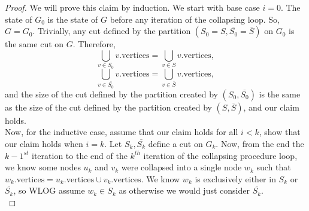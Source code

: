 \documentclass[psamsfonts, 10pt]{amsart}
\theoremstyle{definition}
\theoremstyle{remark}
\numberwithin{equation}{section}
\begin{document}
\begin{proof}
We will prove this claim by induction. We start with base case $i = 0$. The state of $G_0$ is the state of $G$ before any iteration of the collapsing loop. So, $G = G_0$. Trivially, any cut defined by the partition $(S_0 = S, \overline{S_0} = \overline{S})$ on $G_0$ is the same cut on $G$. Therefore,
\[
\bigcup_{v \in S_0} v.\text{vertices} = \bigcup_{v \in S} v.\text{vertices},
\]
\[
\bigcup_{v \in \overline{S_0}} v.\text{vertices} = \bigcup_{v \in \overline{S}} v.\text{vertices},
\]
and the size of the cut defined by the partition created by $(S_0, \overline{S_0})$ is the same as the size of the cut defined by the partition created by $(S, \overline{S})$, and our claim holds.\\

Now, for the inductive case, assume that our claim holds for all $i < k$, show that our claim holds when $i = k$. Let $S_k, \overline{S_k} $ define a cut on $G_k$. Now, from the end the $k - 1^{st}$ iteration to the end of the $k^{th}$ iteration of the collapsing procedure loop, we know some nodes $u_k$ and $v_k$ were collapsed into a single node $w_k$ such that $w_k.\text{vertices} = u_k.\text{vertices} \cup v_k.\text{vertices}$. We know $w_k$ is exclusively either in $S_k$ or $\overline{S_k}$, so WLOG assume $w_k \in S_k$ as otherwise we would just consider $\overline{S_k}$.\\


\end{proof}
\end{document}

